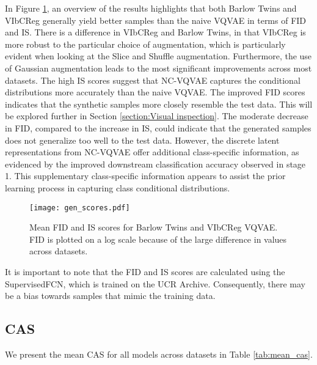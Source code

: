 \documentclass[../../thesis.tex]{subfiles}
\begin{document}
In Figure \ref{fig:mean_gen_scores}, an overview of the results highlights that both Barlow Twins and VIbCReg generally yield better samples than the naive VQVAE in terms of FID and IS. There is a difference in VIbCReg and Barlow Twins, in that VIbCReg is more robust to the particular choice of augmentation, which is particularly evident when looking at the Slice and Shuffle augmentation. Furthermore, the use of Gaussian augmentation leads to the most significant improvements across most datasets. The high IS scores suggest that NC-VQVAE captures the conditional distributions more accurately than the naive VQVAE. The improved FID scores indicates that the synthetic samples more closely resemble the test data. This will be explored further in Section \ref{section:Visual inspection}. The moderate decrease in FID, compared to the increase in IS, could indicate that the generated samples does not generalize too well to the test data. However, the discrete latent representations from NC-VQVAE offer additional class-specific information, as evidenced by the improved downstream classification accuracy observed in stage 1. This supplementary class-specific information appears to assist the prior learning process in capturing class conditional distributions.

\begin{figure}[h]
    \texttt{[image: gen\_scores.pdf]}
    \centering  
    \caption{Mean FID and IS scores for Barlow Twins and VIbCReg VQVAE. FID is plotted on a log scale because of the large difference in values across datasets.}
    \label{fig:mean_gen_scores}
\end{figure}

It is important to note that the FID and IS scores are calculated using the SupervisedFCN, which is trained on the UCR Archive. Consequently, there may be a bias towards samples that mimic the training data.

\subsection{CAS}

We present the mean CAS for all models across datasets in Table \ref{tab:mean_cas}.
\end{document}
